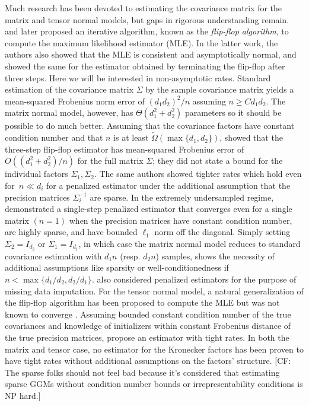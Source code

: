 \documentclass[aos]{imsart}
\theoremstyle{definition}
\newcommand{\CF}[1]{{\color{purple}[CF: #1]}}
\begin{document}
Much research has been devoted to estimating the covariance matrix for the matrix and tensor normal models, but gaps in rigorous understanding remain.
\cite{dutilleul1999mle} and later \cite{werner2008estimation} proposed an iterative algorithm, known as the \emph{flip-flop algorithm}, to compute the maximum likelihood estimator (MLE).
In the latter work, the authors also showed that the MLE is consistent and asymptotically normal, and showed the same for the estimator obtained by terminating the flip-flop after three steps.
Here we will be interested in non-asymptotic rates.
Standard estimation of the covariance matrix $\Sigma$ by the sample covariance matrix yields a mean-squared Frobenius norm error of $(d_1 d_2)^2/n$ assuming $n \geq C d_1 d_2$.
The matrix normal model, however, has $\Theta(d_1^2 + d_2^2)$ parameters so it should be possible to do much better.
Assuming that the covariance factors have constant condition number and that $n$ is at least $\tilde{\Omega}(\max\{d_1,d_2\})$, \cite{tsiligkaridis2013convergence} showed that the three-step flip-flop estimator has mean-squared Frobenius error of $O((d_1^2 + d_2^2)/n)$ for the full matrix $\Sigma$; they did not state a bound for the individual factors $\Sigma_1,\Sigma_2$.
The same authors showed tighter rates which hold even for~$n\ll d_i$ for a penalized estimator under the additional assumption that the precision matrices $\Sigma_i^{-1}$ are sparse.
In the extremely undersampled regime, \cite{zhou2014gemini} demonstrated a single-step penalized estimator that converges even for a single matrix $(n=1)$ when the precision matrices have constant condition number, are highly sparse, and have bounded $\ell_1$ norm off the diagonal.
Simply setting $\Sigma_2 = I_{d_2}$ or $\Sigma_1 = I_{d_1}$, in which case the matrix normal model reduces to standard covariance estimation with $d_1 n$ (resp. $d_2 n$) samples, shows the necessity of additional assumptions like sparsity or well-conditionedness if $n < \max\{d_1/d_2, d_2/d_1\}$.
\cite{allen2010transposable} also considered penalized estimators for the purpose of missing data imputation.
For the tensor normal model, a natural generalization of the flip-flop algorithm has been proposed to compute the MLE but was not known to converge \citep{mardia1993spatial,manceur2013maximum}.
Assuming bounded constant condition number of the true covariances and knowledge of initializers within constant Frobenius distance of the true precision matrices, \cite{sun2015nonconvex} propose an estimator with tight rates.
In both the matrix and tensor case, no estimator for the Kronecker factors has been proven to have tight rates without additional assumptions on the factors' structure.
\CF{The sparse folks should not feel bad because it's considered that estimating sparse GGMs without condition number bounds or irrepresentability conditions is NP hard.}
\end{document}
